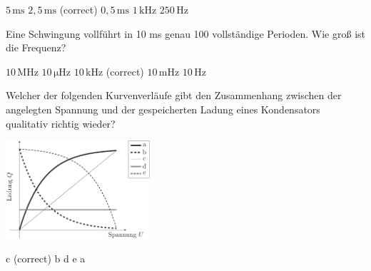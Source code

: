 \documentclass[11pt]{exam}
\begin{document}
\begin{questions}
\begin{choices}
	\choice \(\mathrm{5\,ms}\)
	\choice \(\mathrm{2,5\,ms}\) (correct)
	\choice \(\mathrm{0,5\,ms}\)
	\choice \(\mathrm{1\,kHz}\)
	\choice \(\mathrm{250\,Hz}\)
\end{choices}

\vspace{3mm}\question Eine Schwingung vollführt in 10 ms genau 100 vollständige Perioden. Wie groß ist die Frequenz?

\begin{choices}
	\choice \(\mathrm{10\,MHz}\)
	\choice \(\mathrm{10\,\mu Hz}\)
	\choice \(\mathrm{10\,kHz}\) (correct)
	\choice \(\mathrm{10\,mHz}\)
	\choice \(\mathrm{10\,Hz}\)
\end{choices}

\vspace{3mm}\question Welcher der folgenden Kurvenverläufe gibt den Zusammenhang zwischen der angelegten Spannung und der gespeicherten Ladung eines Kondensators qualitativ richtig wieder? 

\includegraphics[width=0.4\textwidth]{images/Kondensator-Q-U.png}

\begin{choices}
	\choice c (correct)
	\choice b
	\choice d
	\choice e
	\choice a
\end{choices}

\vspace{3mm}\end{questions}
\end{document}
